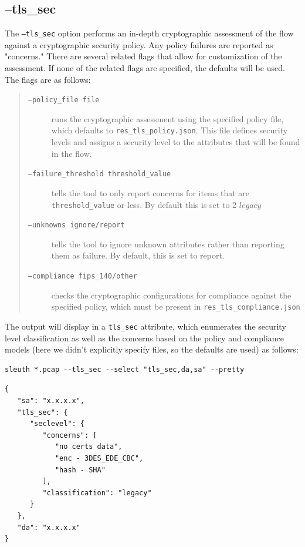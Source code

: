 \documentclass{book}
\begin{document}
\subsection{--tls\_sec}
\label{tlssec}
The \texttt{--tls\_sec} option performs an in-depth cryptographic assessment of the
flow against a cryptographic security policy. Any policy failures are reported
as "concerns." There are several related flags that allow for customization of
the assessment. If none of the related flags are specified, the defaults will
be used. The flags are as follows:
\begin{quote}
\begin{description}
\item [\texttt{--policy\_file file}] runs the cryptographic assessment using the specified
policy file, which defaults to \texttt{res\_tls\_policy.json}. This file defines security levels
and assigns a security level to the attributes that will be found in the flow.
\item [\texttt{--failure\_threshold threshold\_value}] tells the tool to only report
concerns for items that are \texttt{threshold\_value} or less. By default this is set to 2 \(legacy\)
\item [\texttt{--unknowns ignore/report}] tells the tool to ignore unknown attributes
rather than reporting them as failure. By default, this is set to report.
\item [\texttt{--compliance fips\_140/other}] checks the cryptographic configurations
for compliance against the specified policy, which must be present in \texttt{res\_tls\_compliance.json}
\end{description}
\end{quote}
The output will display in a \texttt{tls\_sec} attribute, which enumerates the security level
classification as well as the concerns based on the policy and compliance models
(here we didn't explicitly specify files, so the defaults are used)
as follows:
\begin{mdframed}[style=cli]
  \begin{verbatim}
sleuth *.pcap --tls_sec --select "tls_sec,da,sa" --pretty
  \end{verbatim}
\begin{verbatim}
{
   "sa": "x.x.x.x", 
   "tls_sec": {
      "seclevel": {
         "concerns": [
            "no certs data", 
            "enc - 3DES_EDE_CBC", 
            "hash - SHA"
         ], 
         "classification": "legacy"
      }
   }, 
   "da": "x.x.x.x"
}
\end{verbatim}
\end{mdframed}
\end{document}
